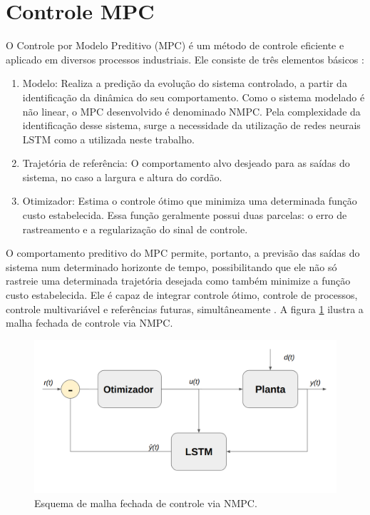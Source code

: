 \newpage
\section{Controle MPC}
O Controle por Modelo Preditivo (MPC) é um método de controle eficiente e aplicado em diversos processos industriais. Ele consiste de três elementos básicos \cite{han2013nonlinear}:
\begin{enumerate}
    \item Modelo: Realiza a predição da evolução do sistema controlado, a partir da identificação da dinâmica do seu comportamento. Como o sistema modelado é não linear, o MPC desenvolvido é denominado NMPC. Pela complexidade da identificação desse sistema, surge a necessidade da utilização de redes neurais LSTM como a utilizada neste trabalho.
    \item Trajetória de referência: O comportamento alvo desjeado para as saídas do sistema, no caso a largura e altura do cordão.
    \item Otimizador: Estima o controle ótimo que minimiza uma determinada função custo estabelecida. Essa função geralmente possui duas parcelas: o erro de rastreamento e a regularização do sinal de controle.
\end{enumerate}

O comportamento preditivo do MPC permite, portanto, a previsão das saídas do sistema num determinado horizonte de tempo, possibilitando que ele não só rastreie uma determinada trajetória desejada como também minimize a função custo estabelecida. Ele é capaz de integrar controle ótimo, controle de processos, controle multivariável e referências futuras, simultâneamente \cite{han2013nonlinear}. A figura \ref{fig:mpc_scheme} ilustra a malha fechada de controle via NMPC.

\begin{figure}[hbt!]
    \centering
    \includegraphics[width=0.7\linewidth]{Imagens/chap02/mpc_scheme.png}
    \caption{Esquema de malha fechada de controle via NMPC.}
    \label{fig:mpc_scheme}
\end{figure}

